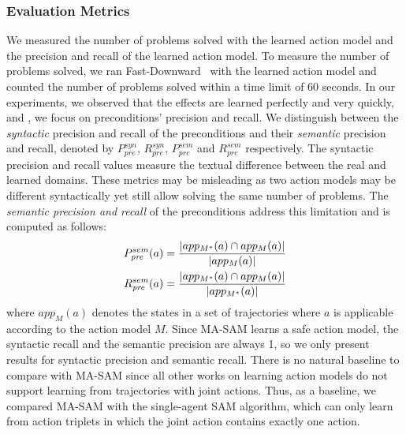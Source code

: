 \documentclass[letterpaper]{article} %
\newcommand{\pre}{\textit{pre}}
\theoremstyle{definition}
\theoremstyle{remark}
\newcommand{\realm}{\ensuremath{M^*}\xspace}
\newcommand{\sam}{\ac{SAM}\xspace}
\newcommand{\masam}{\ac{MA-SAM}\xspace}
\begin{document}
\subsubsection{Evaluation Metrics}
We measured the number of problems solved with the learned action model
and the precision and recall of the learned action model.
To measure the number of problems solved,
we ran Fast-Downward~\cite{helmert2006fast} with
the learned action model and counted the number of problems solved within a time limit of 60 seconds. %
In our experiments, we observed that the effects are learned perfectly and very quickly, and , we focus on preconditions' precision and recall.
We distinguish between the \textit{syntactic} precision and recall of the preconditions and their \textit{semantic} precision and recall, denoted by $P^{syn}_\pre$, $R^{syn}_\pre$, $P^{sem}_\pre$ and $R^{sem}_\pre$ respectively.
The syntactic precision and recall values measure the textual difference between the real and learned domains.
These metrics may be misleading as two action models may be different syntactically yet still allow solving the same number of problems.
The \textit{semantic precision and recall} of the preconditions address this limitation and is computed as follows:
\begin{align*}\small
    P^{sem}_{\pre}(a)= \frac{|app_{\realm}(a)\cap app_M(a)|}{|app_M(a)|} \\
    R^{sem}_{\pre}(a)= \frac{|app_{\realm}(a)\cap app_M(a)|}{|app_{\realm}(a)|}
\end{align*}
where $app_M(a)$ denotes the states in a set of trajectories where $a$ is applicable according to the action model $M$.
Since \masam learns a safe action model, the syntactic recall and the semantic precision are always 1, so we only present results for syntactic precision and semantic recall.
There is no natural baseline to compare with \masam since all other works on learning action models do not support learning from trajectories with joint actions.
Thus, as a baseline, we compared \masam with the single-agent \sam algorithm, which can only learn from action triplets in which the joint action contains exactly one action.
\end{document}
